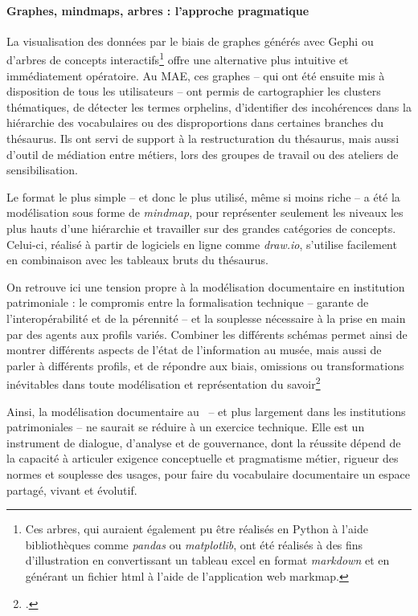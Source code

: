\paragraph*{Graphes, mindmaps, arbres : l’approche pragmatique}
La visualisation des données par le biais de graphes générés avec Gephi ou d'arbres de concepts interactifs\footnote{Ces arbres, qui auraient également pu être réalisés en Python à l'aide bibliothèques comme \textit{pandas} ou \textit{matplotlib}, ont été réalisés à des fins d'illustration en convertissant un tableau excel en format \textit{markdown} et en générant un fichier html à l'aide de l'application web markmap.} offre une alternative plus intuitive et immédiatement opératoire. Au MAE, ces graphes – qui ont été ensuite mis à disposition de tous les utilisateurs – ont permis de cartographier les clusters thématiques, de détecter les termes orphelins, d'identifier des incohérences dans la hiérarchie des vocabulaires ou des disproportions dans certaines branches du thésaurus. Ils ont servi de support à la restructuration du thésaurus, mais aussi d'outil de médiation entre métiers, lors des groupes de travail ou des ateliers de sensibilisation.

Le format le plus simple -- et donc le plus utilisé, même si moins riche -- a été la modélisation sous forme de \textit{mindmap}, pour représenter seulement les niveaux les plus hauts d'une hiérarchie et travailler sur des grandes catégories de concepts. Celui-ci,  réalisé à partir de logiciels en ligne comme \textit{draw.io}, s'utilise facilement en combinaison avec les tableaux bruts du thésaurus.

On retrouve ici une tension propre à la modélisation documentaire en institution patrimoniale : le compromis entre la formalisation technique – garante de l'interopérabilité et de la pérennité – et la souplesse nécessaire à la prise en main par des agents aux profils variés. Combiner les différents schémas permet ainsi de montrer différents aspects de l'état de l'information au musée, mais aussi de parler à différents profils, et de répondre aux biais, omissions ou transformations inévitables dans toute modélisation et représentation du savoir\footcite{bowkerArrangerChosesConsequences2023}

Ainsi, la modélisation documentaire au \mae~– et plus largement dans les institutions patrimoniales – ne saurait se réduire à un exercice technique. Elle est un instrument de dialogue, d'analyse et de gouvernance, dont la réussite dépend de la capacité à articuler exigence conceptuelle et pragmatisme métier, rigueur des normes et souplesse des usages, pour faire du vocabulaire documentaire un espace partagé, vivant et évolutif.

